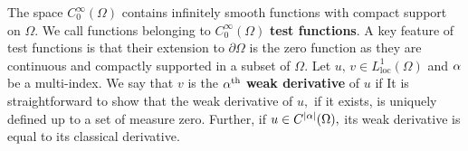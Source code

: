 The space $C_0^\infty(\Omega)$ contains infinitely smooth functions with compact support on $\Omega.$ We call functions belonging to $C_0^\infty(\Omega)$ \textbf{test functions}. A key feature of test functions is that their extension to $\partial\Omega$ is the zero function as they are continuous and compactly supported in a subset of $\Omega.$ Let $u,\,v\in L^1_{\mathrm{loc}}(\Omega)$ and $\alpha$ be a multi-index. We say that $v$ is the $\alpha^\mathrm{th}$ \textbf{weak derivative} of $u$ if
It is straightforward to show that the weak derivative of $u,$ if it exists, is uniquely defined up to a set of measure zero. Further, if $u\in C^\abs{\alpha}(\Omega),$ its weak derivative is equal to its classical derivative.
